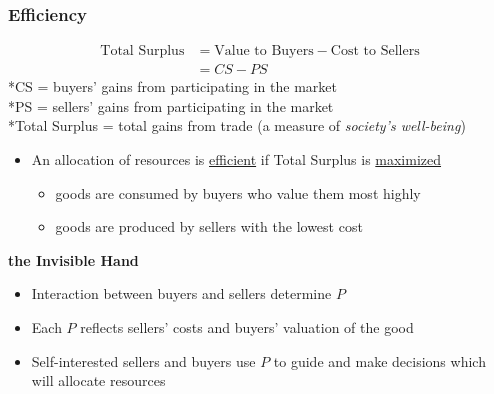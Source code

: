 \documentclass{article}
\begin{document}
\begin{multicols}{2}
\subsubsection{Efficiency}
\begin{equation*}
	\begin{aligned}
		\text{Total Surplus} &= \text{Value to Buyers} - \text{Cost to Sellers}\\
		&= CS - PS
	\end{aligned}
\end{equation*}
*CS = buyers' gains from participating in the market\\
*PS = sellers' gains from participating in the market\\
*Total Surplus = total gains from trade (a measure of \textit{society's well-being})\\

\begin{itemize}
	\item An allocation of resources is \underline{efficient} if Total Surplus is \underline{maximized}
	\begin{itemize}
		\item goods are consumed by buyers who value them most highly
		\item goods are produced by sellers with the lowest cost\\
	\end{itemize}
\end{itemize}


\textbf{the Invisible Hand}
\begin{itemize}
	\item Interaction between buyers and sellers determine $P$
	\item Each $P$ reflects sellers' costs and buyers' valuation of the good
	\item Self-interested sellers and buyers use $P$ to guide and make decisions which will allocate resources\\
\end{itemize}


\end{multicols}
\end{document}

